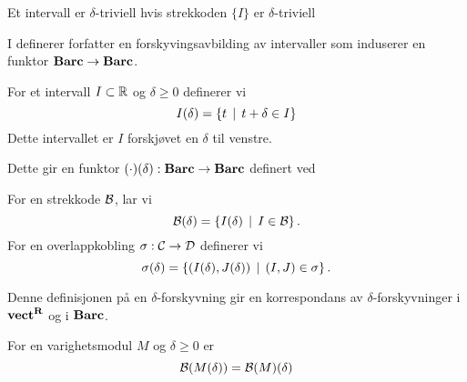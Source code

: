 \begin{bemerk}\label{bem:int_triv}
  Et intervall er $\delta$-triviell hvis strekkoden
  $\{I\}$ er $\delta$-triviell
\end{bemerk}

I \citep[seksjon 2.5]{Bauer2020} definerer forfatter en
forskyvingsavbilding av intervaller som induserer en
funktor $\textnormal{\textbf{Barc}}\to\textnormal{\textbf{Barc}}$.
\begin{definisjon}\label{def:IntSkyv}
    For et intervall $I\subset\mathbb{R}$ og $\delta\geq 0$ definerer vi
    \[I(\delta) = \left\{t\,\mid\,t+\delta\in I\right\}\]
    Dette intervallet er $I$ forskjøvet en $\delta$ til venstre.
\end{definisjon}

Dette gir en funktor $(\cdot)(\delta):\textnormal{\textbf{Barc}}\to\textnormal{\textbf{Barc}}$ definert ved

\begin{definisjon}
    For en strekkode $\mathcal{B}$, lar vi
    \[\mathcal{B}(\delta) = \left\{I(\delta)\,\mid\,I\in\mathcal{B}\right\}.\]
    For en overlappkobling $\sigma:\mathcal{C}\to\mathcal{D}$ definerer vi
    \[\sigma(\delta) = \left\{(I(\delta),J(\delta))\,\mid\,(I,J)\in\sigma\right\}.\]
\end{definisjon}

Denne definisjonen på en $\delta$-forskyvning gir en
korrespondans av $\delta$-forskyvninger i $\textnormal{\textbf{vect}}^{\textnormal{\textbf{{R}}}}$ og
i $\textnormal{\textbf{Barc}}$.

\begin{lemma}\label{lem:VMBarcshift}
  For en varighetsmodul $M$ og $\delta\geq0$ er
  \[\mathcal{B}(M(\delta))=\mathcal{B}(M)(\delta)\]
\end{lemma}

